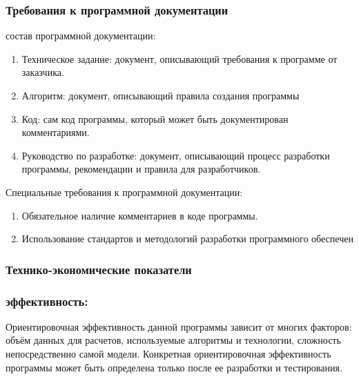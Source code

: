  \begin{center}\subsubsection*{Требования к программной документации}\end{center}


 \hspace{0pt} состав программной документации:\\
 \begin{enumerate}
  \item Техническое задание: документ, описывающий требования к программе от заказчика.
  \item Алгоритм: документ, описывающий правила создания программы
  \item Код: сам код программы, который может быть документирован комментариями.
  \item Руководство по разработке: документ, описывающий процесс разработки программы, рекомендации и правила для разработчиков.\newline
 \end{enumerate}

 Специальные требования к программной документации:
 \begin{enumerate}
  \item Обязательное наличие комментариев в коде программы.
  \item Использование стандартов и методологий разработки программного обеспечен\newline
 \end{enumerate}
 \begin{center}\subsubsection*{Технико-экономические показатели}\end{center}

 \subsubsection*{ эффективность:}
 Ориентировочная эффективность данной программы зависит от многих факторов: объём данных для расчетов, используемые алгоритмы и технологии, сложность непосредственно самой модели. Конкретная ориентировочная эффективность программы может быть определена только после ее разработки и тестирования.\newline

